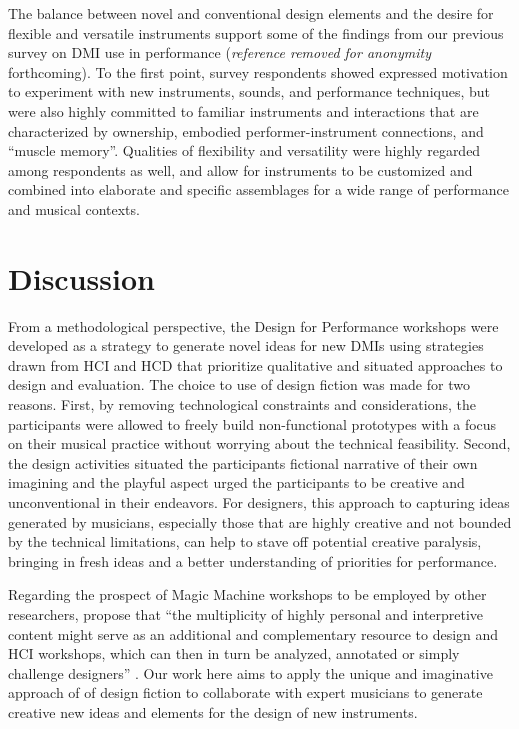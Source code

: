 \documentclass[letterpaper, 12pt]{article}
\begin{document}
The balance between novel and conventional design elements and the desire for flexible and versatile instruments support some of the findings from our previous survey on DMI use in performance
(\emph{reference removed for anonymity} forthcoming).
To the first point, survey respondents showed expressed motivation to experiment with new instruments, sounds, and performance techniques, but were also highly committed to familiar instruments and interactions that are characterized by ownership, embodied performer-instrument connections, and ``muscle memory''. Qualities of flexibility and versatility were highly regarded among respondents as well, and allow for instruments to be customized and combined into elaborate and specific assemblages for a wide range of performance and musical contexts. 

\section{Discussion}
\label{sec:discussion}

From a methodological perspective, the Design for Performance workshops were developed as a strategy to generate novel ideas for new DMIs using strategies drawn from HCI and HCD that prioritize qualitative and situated approaches to design and evaluation. The choice to use of design fiction was made for two reasons. First, by removing technological constraints and considerations, the participants were allowed to freely build non-functional prototypes with a focus on their musical practice without worrying about the technical feasibility. Second, the design activities situated the participants fictional narrative of their own imagining and the playful aspect urged the participants to be creative and unconventional in their endeavors. For designers, this approach to capturing ideas generated by musicians, especially those that are highly creative and not bounded by the technical limitations, can help to stave off potential creative paralysis, bringing in fresh ideas and a better understanding of priorities for performance.

Regarding the prospect of Magic Machine workshops to be employed by other researchers, \citeauthor{Andersen2019} propose that ``the multiplicity of highly personal and interpretive content might serve as an additional and complementary resource to design and HCI workshops, which can then in turn be analyzed, annotated or simply challenge designers'' \citeyearpar[p. 12]{Andersen2019}. Our work here aims to apply the unique and imaginative approach of of design fiction to collaborate with expert musicians to generate creative new ideas and elements for the design of new instruments. 
\end{document}
